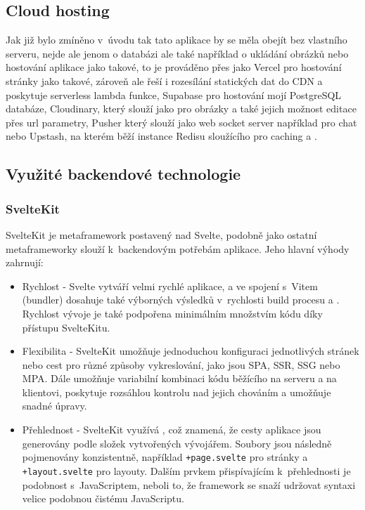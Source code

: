 \documentclass[12pt, a4paper,
openright
]{report}
\begin{document}
\subsection{Cloud hosting}
Jak již bylo zmíněno v~úvodu tak tato aplikace by se měla obejít bez vlastního serveru, nejde ale jenom o databázi ale také například o ukládání obrázků nebo hostování aplikace jako takové, to je prováděno přes  jako Vercel pro hostování stránky jako takové, zároveň ale řeší i rozesílání statických dat do CDN a poskytuje serverless lambda funkce, Supabase pro hostování mojí PostgreSQL databáze, Cloudinary, který slouží jako  pro obrázky a také jejich možnost editace přes url parametry, Pusher který slouží jako web socket server například pro chat nebo Upstash, na kterém běží instance Redisu sloužícího pro caching a .

\subsection{Využité backendové technologie}

\subsubsection{SvelteKit}

SvelteKit je metaframework postavený nad Svelte, podobně jako ostatní metaframeworky slouží k~backendovým potřebám aplikace. Jeho hlavní výhody zahrnují:
\begin{itemize}
	\item Rychlost - Svelte vytváří velmi rychlé aplikace, a ve spojení s~Vitem (bundler) dosahuje také výborných výsledků v~rychlosti build procesu a . Rychlost vývoje je také podpořena minimálním množstvím  kódu díky přístupu SvelteKitu.
	\item Flexibilita - SvelteKit umožňuje jednoduchou konfiguraci jednotlivých stránek nebo cest pro různé způsoby vykreslování, jako jsou SPA, SSR, SSG nebo MPA. Dále umožňuje variabilní kombinaci kódu běžícího na serveru a na klientovi, poskytuje rozsáhlou kontrolu nad jejich chováním a umožňuje snadné úpravy.
	\item Přehlednost - SvelteKit využívá , což znamená, že cesty aplikace jsou generovány podle složek vytvořených vývojářem. Soubory jsou následně pojmenovány konzistentně, například \texttt{+page.svelte} pro stránky a \texttt{+layout.svelte} pro layouty. Dalším prvkem přispívajícím k~přehlednosti je podobnost s~JavaScriptem, neboli to, že framework se snaží udržovat syntaxi velice podobnou čistému JavaScriptu.
\end{itemize} 
\end{document}
